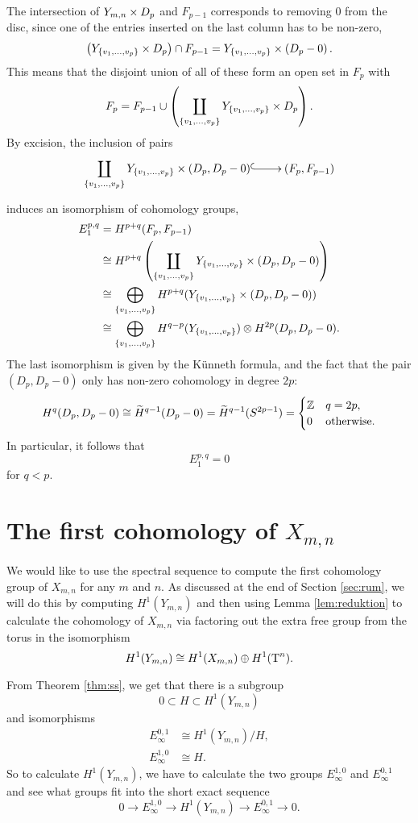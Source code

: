 The intersection of $Y_{m,n}\times D_p$ and $F_{p-1}$ corresponds to
removing 0 from the disc, since one of the entries inserted on the
last column has to be non-zero,
\[ \left(Y_{\left\{ v_1,\dots,v_p \right\}}\times D_p \right) \cap F_{p-1} =
Y_{\left\{ v_1,\dots,v_p \right\}} \times \left(D_p-0\right). \]
This means that the disjoint union of all of these form an open set in
$F_p$ with
\[ F_p = F_{p-1}\cup \left(\coprod_{\left\{ v_1,\dots,v_p \right\}}
  Y_{\left\{ v_1,\dots,v_p \right\}}\times D_p\right). \]
By excision, the inclusion of pairs
\[ \xymatrix{ \displaystyle \coprod_{\set{v_1,\dots,v_p}}
  Y_{\set{v_1,\dots,v_p}}\times (D_p,D_p-0) \ar@{^(->}[r] &
  (F_p,F_{p-1}) } \]
induces an isomorphism of cohomology groups,
\begin{align*}
  E_1^{p,q} &= H^{p+q}(F_p,F_{p-1}) \\
            &\cong H^{p+q}\left(\coprod_{\left\{ v_1,\dots,v_p \right\}}
              Y_{\left\{ v_1,\dots,v_p \right\}}\times (D_p,D_p-0)\right) \\   
            &\cong \bigoplus_{\left\{ v_1,\dots,v_p \right\}}
              H^{p+q}(Y_{\left\{ v_1,\dots,v_p \right\}}\times (D_p,D_p-0)) \\   
            &\cong \bigoplus_{\left\{ v_1,\dots,v_p \right\}}
              H^{q-p}(Y_{\left\{ v_1,\dots,v_p \right\}})\otimes H^{2p}(D_p,D_p-0).
\end{align*}
The last isomorphism is given by the K\"unneth formula, and the fact
that the pair $(D_p,D_p-0)$ only has non-zero cohomology in degree
$2p$:
\[ H^q(D_p,D_p-0) \cong \widetilde H^{q-1}(D_p-0) = \widetilde
H^{q-1}(S^{2p-1}) =
\begin{cases}
  \mathbb{Z} & q = 2p, \\
  0 & \text{otherwise}.
\end{cases} \]
In particular, it follows that
\[ E_1^{p,q} = 0 \]
for $q < p$.

\section{The first cohomology of $X_{m,n}$}
\label{sec:firstcohom}

We would like to use the spectral sequence to compute the first
cohomology group of $X_{m,n}$ for any $m$ and $n$. As discussed at the
end of Section \ref{sec:rum}, we will do this by computing
$H^1(Y_{m,n})$ and
then using Lemma \ref{lem:reduktion} to calculate the cohomology of
$X_{m,n}$ via factoring out the extra free group from the torus
in the isomorphism
\[ H^1(Y_{m,n}) \cong H^1(X_{m,n}) \oplus H^1(\operatorname{T}^n). \]

From Theorem \ref{thm:ss}, we get that there is a subgroup
\[ 0 \subset H \subset H^1(Y_{m,n}) \]
and isomorphisms
\begin{align*}
  E_\infty^{0,1} &\cong H^1(Y_{m,n})/H, \\
  E_\infty^{1,0} &\cong H.
\end{align*}
So to calculate $H^1(Y_{m,n})$, we have to calculate the two groups
$E_\infty^{1,0}$ and $E_\infty^{0,1}$ and see what groups fit
into the short exact sequence
\[ 0 \to E^{1,0}_\infty \to H^1(Y_{m,n}) \to E^{0,1}_\infty \to 0. \]

